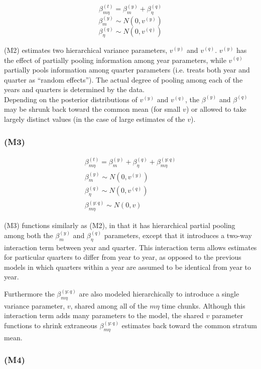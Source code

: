 \documentclass[12pt]{article}
\begin{document}
\[\beta^{(t)}_{m\eta} = \beta^{(y)}_{m} + \beta^{(q)}_{\eta}\]
\[\beta^{(y)}_{m} \sim N(0, v^{(y)})\]
\[\beta^{(q)}_{\eta} \sim N(0, v^{(q)})\]

(M2) estimates two hierarchical variance parameters, \(v^{(y)}\) and
\(v^{(q)}\). \(v^{(y)}\) has the effect of partially pooling information
among year parameters, while \(v^{(q)}\) partially pools information
among quarter parameters (i.e. treats both year and quarter as ``random
effects''). The actual degree of pooling among each of the years and
quarters is determined by the data.\\
Depending on the posterior distributions of \(v^{(y)}\) and \(v^{(q)}\),
the \(\beta^{(y)}\) and \(\beta^{(q)}\) may be shrunk back toward the
common mean (for small \(v\)) or allowed to take largely distinct values
(in the case of large estimates of the \(v\)).

\subsubsection{(M3)}\label{m3}

\begin{eqnarray*}
&\beta^{(t)}_{m\eta} = \beta^{(y)}_{m} + \beta^{(q)}_{\eta} + \beta^{(y:q)}_{m\eta} & \\
&\beta^{(y)}_{m} \sim N(0, v^{(y)}) & \\
&\beta^{(q)}_{\eta} \sim N(0, v^{(q)}) & \\
&\beta^{(y:q)}_{m\eta} \sim N(0, v) &
\end{eqnarray*}

(M3) functions similarly as (M2), in that it has hierarchical partial
pooling among both the \(\beta^{(y)}_{m}\) and \(\beta^{(q)}_{\eta}\)
parameters, except that it introduces a two-way interaction term between
year and quarter. This interaction term allows estimates for particular
quarters to differ from year to year, as opposed to the previous models
in which quarters within a year are assumed to be identical from year to
year.

Furthermore the \(\beta^{(y:q)}_{m\eta}\) are also modeled
hierarchically to introduce a single variance parameter, \(v\), shared
among all of the \(m\eta\) time chunks. Although this interaction term
adds many parameters to the model, the shared \(v\) parameter functions
to shrink extraneous \(\beta^{(y:q)}_{m\eta}\) estimates back toward the
common stratum mean.

\subsubsection{(M4)}\label{m4}
\end{document}
